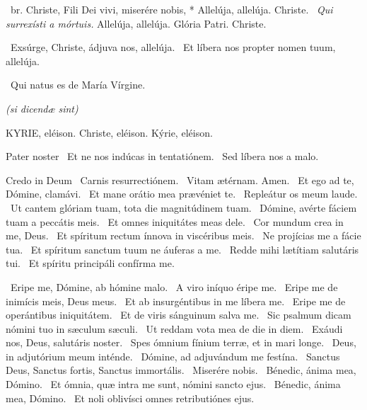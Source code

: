 

\R\ br. Christe, Fili Dei vivi, miserére nobis, * Allelúja, allelúja. Christe. \V\ \textit{Qui surrexísti a mórtuis.} Allelúja, allelúja. Glória Patri. Christe.

\V\ Exsúrge, Christe, ádjuva nos, allelúja. \R\ Et líbera nos propter nomen tuum, allelúja.


\V\ Qui natus es de María Vírgine.

\sectionornament


\textit{(si dicendæ sint)}

KYRIE, eléison. Christe, eléison. Kýrie, eléison.

Pater noster  \V\ Et ne nos indúcas in tentatiónem. \R\ Sed líbera nos a malo.

Credo in Deum  \V\ Carnis resurrectiónem. \R\ Vitam ætérnam. Amen. \V\ Et ego ad te, Dómine, clamávi. \R\ Et mane orátio mea prævéniet te. \V\ Repleátur os meum laude. \R\ Ut cantem glóriam tuam, tota die magnitúdinem tuam. \V\ Dómine, avérte fáciem tuam a peccátis meis. \R\ Et omnes iniquitátes meas dele. \V\ Cor mundum crea in me, Deus. \R\ Et spíritum rectum ínnova in viscéribus meis. \V\ Ne projícias me a fácie tua. \R\ Et spíritum sanctum tuum ne áuferas a me. \V\ Redde mihi lætítiam salutáris tui. \R\ Et spíritu principáli confírma me.


\V\ Eripe me, Dómine, ab hómine malo. \R\ A viro iníquo éripe me. \V\ Eripe me de inimícis meis, Deus meus. \R\ Et ab insurgéntibus in me líbera me. \V\ Eripe me de operántibus iniquitátem. \R\ Et de viris sánguinum salva me. \V\ Sic psalmum dicam nómini tuo in sæculum sæculi. \R\ Ut reddam vota mea de die in diem. \V\ Exáudi nos, Deus, salutáris noster. \R\ Spes ómnium fínium terræ, et in mari longe. \V\ Deus, in adjutórium meum inténde. \R\ Dómine, ad adjuvándum me festína. \V\ Sanctus Deus, Sanctus fortis, Sanctus immortális. \R\ Miserére nobis. \V\ Bénedic, ánima mea, Dómino. \R\ Et ómnia, quæ intra me sunt, nómini sancto ejus. \V\ Bénedic, ánima mea, Dómino. \R\ Et noli oblivísci omnes retributiónes ejus.

